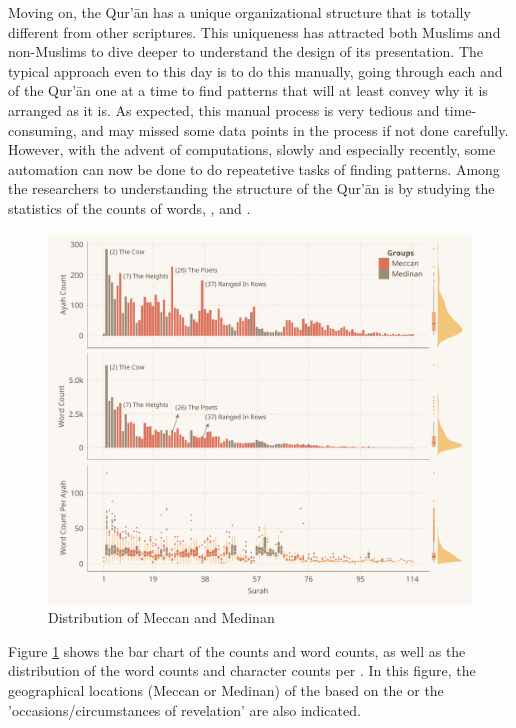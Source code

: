 Moving on, the Qur'\=an has a unique organizational structure that is totally different from other scriptures. This uniqueness has attracted both Muslims and non-Muslims to dive deeper to understand the design of its presentation. The typical approach even to this day is to do this manually, going through each   and   of the Qur'\=an one at a time to find patterns that will at least convey why it is arranged as it is. As expected, this manual process is very tedious and time-consuming, and may missed some data points in the process if not done carefully. However, with the advent of computations, slowly and especially recently, some automation can now be done to do repeatetive tasks of finding patterns. Among the researchers to understanding the structure of the Qur'\=an is by studying the statistics of the counts of words,  , and  .

\begin{figure}[!t]
    \centering
    \includegraphics[width=\textwidth]{img/plot1.pdf}
    \caption{Distribution of Meccan and Medinan  }
    \label{fig:result_ayah_word_count}
\end{figure}

Figure \ref{fig:result_ayah_word_count} shows the bar chart of the   counts and word counts, as well as the distribution of the word counts and character counts per  . In this figure, the geographical locations (Meccan or Medinan) of the   based on the   or the 'occasions/circumstances of revelation' are also indicated.

